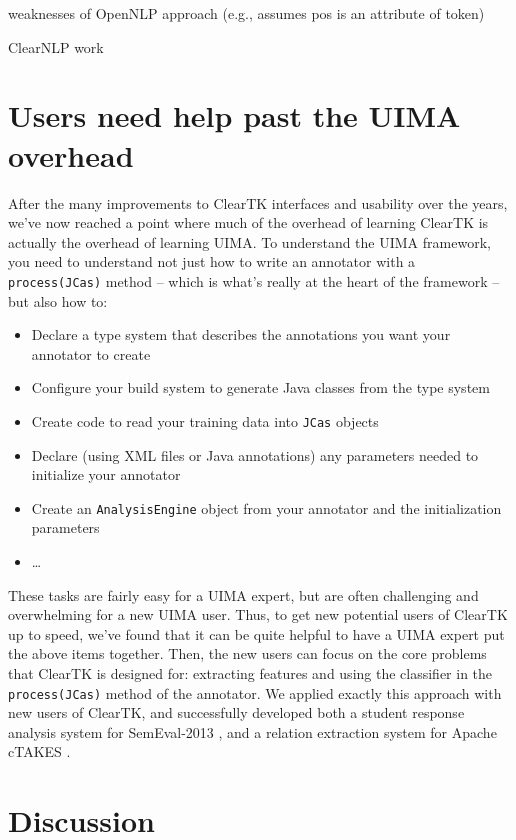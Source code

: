 \documentclass[10pt, a4paper]{article}
\newcommand{\code}[1]{\texttt{\small #1}}
\begin{document}
weaknesses of OpenNLP approach (e.g., assumes pos is an attribute of token)

ClearNLP work


\section{Users need help past the UIMA overhead}
After the many improvements to ClearTK interfaces and usability over the years, we've now reached a point where much of the overhead of learning ClearTK is actually the overhead of learning UIMA.
To understand the UIMA framework, you need to understand not just how to write an annotator with a \code{process(JCas)} method -- which is what's really at the heart of the framework -- but also how to:
\begin{itemize}
\item Declare a type system that describes the annotations you want your annotator to create
\item Configure your build system to generate Java classes from the type system
\item Create code to read your training data into \code{JCas} objects
\item Declare (using XML files or Java annotations) any parameters needed to initialize your annotator
\item Create an \code{AnalysisEngine} object from your annotator and the initialization parameters
\item \ldots
\end{itemize}
These tasks are fairly easy for a UIMA expert, but are often challenging and overwhelming for a new UIMA user.
Thus, to get new potential users of ClearTK up to speed, we've found that it can be quite helpful to have a UIMA expert put the above items together.
Then, the new users can focus on the core problems that ClearTK is designed for: extracting features and using the classifier in the \code{process(JCas)} method of the annotator.
We applied exactly this approach with new users of ClearTK, and successfully developed both a student response analysis system for SemEval-2013 \cite{okoye-bethard-sumner:2013:SemEval-2013}, and a relation extraction system for Apache cTAKES \cite{dligach2013discovering}.

\section{Discussion}



\end{document}
